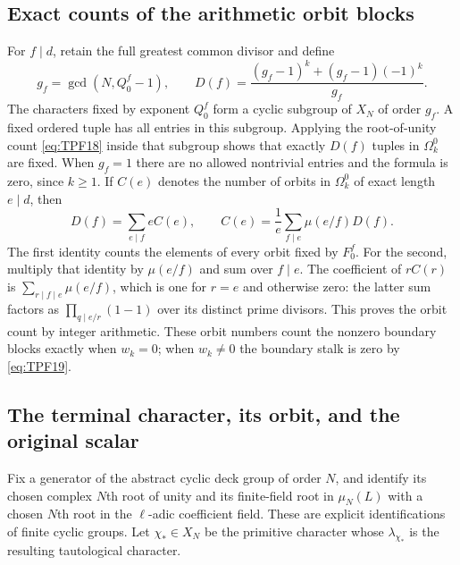 \subsection{Exact counts of the arithmetic orbit blocks}

For \(f\mid d\), retain the full greatest common
divisor and define
\[
 g_f=\gcd(N,Q_0^f-1),\qquad
 D(f)=\frac{(g_f-1)^k+(g_f-1)(-1)^k}{g_f}.
 \tag{TPF.34}\label{eq:TPF34}
\]
The characters fixed by exponent \(Q_0^f\)
form a cyclic subgroup of \(X_N\) of order
\(g_f\). A fixed ordered tuple has all
entries in this subgroup. Applying the
root-of-unity count \eqref{eq:TPF18}
inside that subgroup shows that exactly
\(D(f)\) tuples in \(\Omega_k^0\) are fixed.
When \(g_f=1\) there are no allowed
nontrivial entries and the formula is
zero, since \(k\ge1\).
If \(C(e)\) denotes the number of orbits
in \(\Omega_k^0\) of exact length \(e\mid d\), then
\[
 D(f)=\sum_{e\mid f}eC(e),\qquad
 C(e)=\frac1e\sum_{f\mid e}\mu(e/f)D(f).
 \tag{TPF.35}\label{eq:TPF35}
\]
The first identity counts the elements
of every orbit fixed by \(F_0^f\).
For the second, multiply that identity
by \(\mu(e/f)\) and sum over \(f\mid e\).
The coefficient of \(rC(r)\) is
\(\sum_{r\mid f\mid e}\mu(e/f)\), which
is one for \(r=e\) and otherwise zero:
the latter sum factors as
\(\prod_{q\mid e/r}(1-1)\) over its
distinct prime divisors. This proves
the orbit count by integer arithmetic.
These orbit numbers count the nonzero boundary
blocks exactly when \(w_k=0\); when \(w_k\ne0\)
the boundary stalk is zero by \eqref{eq:TPF19}.

\subsection{The terminal character, its orbit, and the original scalar}

Fix a generator of the abstract cyclic deck group of
order \(N\), and identify its chosen complex \(N\)th
root of unity and its finite-field root in \(\mu_N(L)\)
with a chosen \(N\)th root in the \(\ell\)-adic coefficient
field. These are explicit identifications of finite
cyclic groups. Let \(\chi_*\in X_N\) be the primitive
character whose \(\lambda_{\chi_*}\) is the resulting
tautological character.

